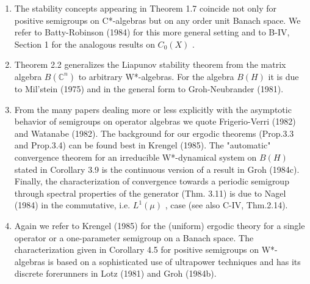 \begin{enumerate}[label=\emph{Section \arabic*:}, wide]
\item
The stability concepts appearing in Theorem 1.7 coincide not only for positive semigroups on C*-algebras but on any order unit Banach space.
We refer to Batty-Robinson (1984) for this more general setting and to B-IV, Section 1 for the analogous results on $ C_{0}(X) $ .

\item
Theorem 2.2 generalizes the Liapunov stability theorem from the matrix algebra $ B(\mathbb{C}^{n}) $  to arbitrary W*-algebras.
For the algebra $ B(H) $  it is due to Mil'stein (1975) and in the general form to Groh-Neubrander (1981).

\item
From the many papers dealing more or less explicitly with the asymptotic behavior of semigroups on operator algebras we quote Frigerio-Verri (1982) and Watanabe (1982).
The background for our ergodic theorems (Prop.3.3 and Prop.3.4) can be found best in Krengel (1985).
The "automatic" convergence theorem for an irreducible W*-dynamical system on $ B(H) $  stated in Corollary 3.9 is the continuous version of a result in Groh (1984c).
Finally, the characterization of convergence towards a periodic semigroup through spectral properties of the generator (Thm. 3.11) is due to Nagel (1984) in the commutative, i.e. $ L^{1}(\mu) $ , case (see also C-IV, Thm.2.14).

\item
Again we refer to Krengel (1985) for the (uniform) ergodic theory for a single operator or a one-parameter semigroup on a Banach space.
The characterization given in Corollary 4.5 for positive semigroups on W*-algebras is based on a sophisticated use of ultrapower techniques and has its discrete forerunners in Lotz (1981) and Groh (1984b).
\end{enumerate}

